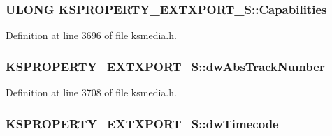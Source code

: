\subsubsection[{\texorpdfstring{Capabilities}{Capabilities}}]{\setlength{\rightskip}{0pt plus 5cm}U\+L\+O\+NG K\+S\+P\+R\+O\+P\+E\+R\+T\+Y\+\_\+\+E\+X\+T\+X\+P\+O\+R\+T\+\_\+\+S\+::\+Capabilities}\hypertarget{struct_k_s_p_r_o_p_e_r_t_y___e_x_t_x_p_o_r_t___s_a7c61fd1ad6265d4255dddc96a601952b}{}\label{struct_k_s_p_r_o_p_e_r_t_y___e_x_t_x_p_o_r_t___s_a7c61fd1ad6265d4255dddc96a601952b}


Definition at line 3696 of file ksmedia.\+h.

\subsubsection[{\texorpdfstring{dw\+Abs\+Track\+Number}{dwAbsTrackNumber}}]{ K\+S\+P\+R\+O\+P\+E\+R\+T\+Y\+\_\+\+E\+X\+T\+X\+P\+O\+R\+T\+\_\+\+S\+::dw\+Abs\+Track\+Number}\hypertarget{struct_k_s_p_r_o_p_e_r_t_y___e_x_t_x_p_o_r_t___s_a01c16694aa538406ae38099593f9e8b7}{}\label{struct_k_s_p_r_o_p_e_r_t_y___e_x_t_x_p_o_r_t___s_a01c16694aa538406ae38099593f9e8b7}


Definition at line 3708 of file ksmedia.\+h.

\subsubsection[{\texorpdfstring{dw\+Timecode}{dwTimecode}}]{ K\+S\+P\+R\+O\+P\+E\+R\+T\+Y\+\_\+\+E\+X\+T\+X\+P\+O\+R\+T\+\_\+\+S\+::dw\+Timecode}\hypertarget{struct_k_s_p_r_o_p_e_r_t_y___e_x_t_x_p_o_r_t___s_ac6041f4d0e74c8b56fe5ea2ca4dfe4fa}{}\label{struct_k_s_p_r_o_p_e_r_t_y___e_x_t_x_p_o_r_t___s_ac6041f4d0e74c8b56fe5ea2ca4dfe4fa}



